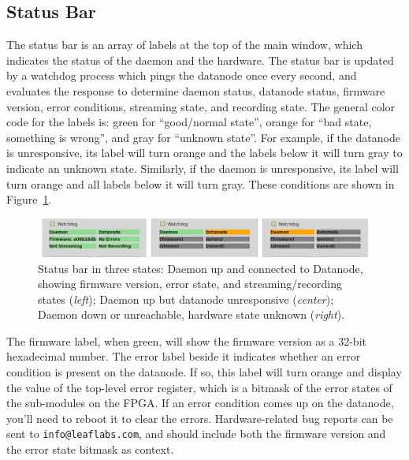 \subsection{Status Bar}
\label{sec_usage_statusbar}

The status bar is an array of labels at the top of the main window, which indicates the status of the daemon and the hardware. The status bar is updated by a watchdog process which pings the datanode once every second, and evaluates the response to determine daemon status, datanode status, firmware version, error conditions, streaming state, and recording state. The general color code for the labels is: green for ``good/normal state'', orange for ``bad state, something is wrong'', and gray for ``unknown state''. For example, if the datanode is unresponsive, its label will turn orange and the labels below it will turn gray to indicate an unknown state. Similarly, if the daemon is unresponsive, its label will turn orange and all labels below it will turn gray. These conditions are shown in Figure~\ref{fig_statusbar}.

\begin{figure}[h!]
\begin{center}
\includegraphics[width=17cm]{screenshots/statusbar_threestates.png}
\end{center}
\caption{Status bar in three states: Daemon up and connected to Datanode, showing firmware version, error state, and streaming/recording states (\textit{left}); Daemon up but datanode unresponsive (\textit{center}); Daemon down or unreachable, hardware state unknown (\textit{right}).}
\label{fig_statusbar}
\end{figure}

The firmware label, when green, will show the firmware version as a 32-bit hexadecimal number. The error label beside it indicates whether an error condition is present on the datanode. If so, this label will turn orange and display the value of the top-level error register, which is a bitmask of the error states of the sub-modules on the FPGA. If an error condition comes up on the datanode, you'll need to reboot it to clear the errors. Hardware-related bug reports can be sent to \texttt{info@leaflabs.com}, and should include both the firmware version and the error state bitmask as context.

